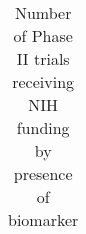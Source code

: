 
\begin{table}[htbp]\centering
\caption{Number of Phase II trials receiving NIH funding by presence of biomarker}
\begin{tabular}{l*{4}{c}}
\hline\hline



\hline\hline
\end{tabular}
\end{table}
